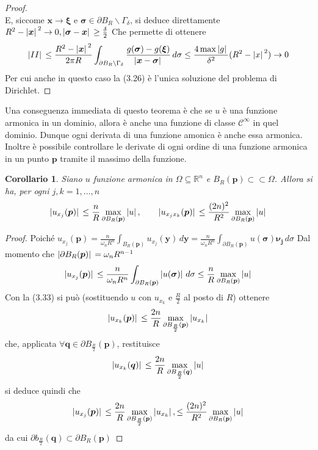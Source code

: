 \documentclass[a4paper,12pt, draft]{article}
\theoremstyle{break}
\newtheorem{corollary}{Corollario}[section]
\numberwithin{equation}{section}
\begin{document}
\begin{proof}
\begin{equation}
\end{equation}
E, siccome \(\bm{x} \to \bm{\xi}\) e \(\bm{\sigma} \in \partial B_R\backslash \Gamma_{\delta}\), si deduce direttamente \(R^2 - \abs*{\bm{x}}^2 \to 0, \abs*{\bm{\sigma} - \bm{x}} \geq \frac{\delta}{2}\)
Che permette di ottenere
\[
  \abs*{II} \leq \frac{R^2 - \abs*{\bm{x}}^2}{2\pi R} \int_{\partial B_R \backslash \Gamma_{\delta}} \frac{g(\bm{\sigma}) - g(\bm{\xi})}{\abs*{\bm{x}-\bm{\sigma}}}\, d\sigma \leq \frac{4 \max{\abs*{g}}}{\delta^2} (R^2 - \abs*{x}^2) \to 0
\]
Per cui anche in questo caso la (3.26) è l'unica soluzione del problema di Dirichlet.
\end{proof}
Una conseguenza immediata di questo teorema è che se \(u\) è una funzione armonica in un dominio, allora è anche una funzione di classe \(\mathcal{C}^{\infty}\) in quel dominio. Dunque ogni derivata di una funzione amonica è anche essa armonica. Inoltre è possibile controllare le derivate di ogni ordine di una funzione armonica in un punto \(\bm{p}\) tramite il massimo della funzione.
\begin{corollary}
  Siano \(u\) funzione armonica in \(\Omega \subseteq \mathbb{R}^n\) e \(B_R(\bm{p}) \subset \subset \Omega\). Allora si ha, per ogni \(j, k = 1, \ldots, n\)
  \begin{equation}
   \abs*{u_{x_j}(\bm{p})} \leq \frac{n}{R}\max_{\partial B_R(\bm{p})} \abs*{u}, \qquad \abs*{u_{x_j x_k}(\bm{p})} \leq \frac{(2n)^2}{R^2} \max_{\partial B_R(\bm{p})} \abs*{u} 
  \end{equation}
\end{corollary}
\begin{proof}
  Poiché \(u_{x_j} (\bm{p}) = \frac{n}{\omega_n R^n} \int_{B_R(\bm{p})} u_{x_j}(\bm{y}) \, d\bm{y} = \frac{n}{\omega_n R^n}\int_{\partial B_R(\bm{p})} u(\bm{\sigma}) \bm{\nu_j} \, d\sigma\)
Dal momento che \(\abs*{\partial B_R(\bm{p})} = \omega_n R^{n-1}\)
\begin{equation}
  \abs*{u_{x_j}(\bm{p})} \leq \frac{n}{\omega_n R^n} \int_{\partial B_R (\bm{p})} \abs*{u(\bm{\sigma})} \, d\sigma \leq \frac{n}{R} \max_{\partial B_R(\bm{p})}\abs*{u}
\end{equation}
Con la (3.33) si può (sostituendo \(u\) con \(u_{x_k}\) e \(\frac{R}{2}\) al posto di \(R\)) ottenere
\[
 \abs*{u_{x_k}(\bm{p})} \leq \frac{2n}{R} \max_{\partial B_{\frac{R}{2}} (\bm{p})} \abs*{u_{x_k}} 
\]
che, applicata \(\forall \bm{q} \in \partial B_{\frac{R}{2}}(\bm{p})\), restituisce
\[
  \abs*{u_{x_k}(\bm{q})} \leq \frac{2n}{R} \max_{\partial B_{\frac{R}{2}}(\bm{q})} \abs*{u}
\]
si deduce quindi che 
\[
  \abs*{u_{x_j}(\bm{p})} \leq \frac{2n}{R}\max_{\partial B_{\frac{R}{2}}(\bm{p})} \abs*{u_{x_k}}, \leq \frac{(2n)^2}{R^2} \max_{\partial B_R(\bm{p})} \abs*{u}  
\]
da cui \(\partial b_{\frac{R}{2}}(\bm{q}) \subset \partial B_R(\bm{p})\)
\end{proof}
\end{document}
